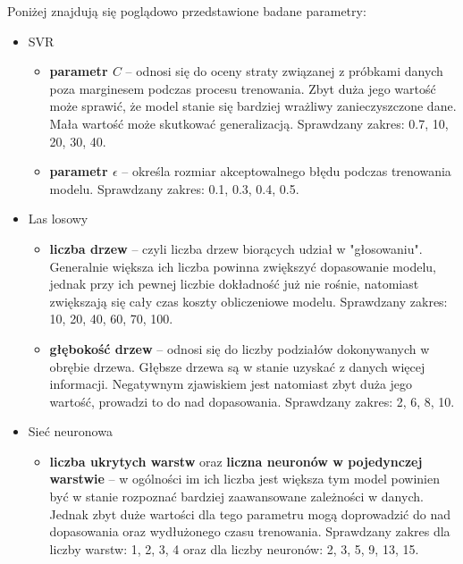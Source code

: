 Poniżej znajdują się poglądowo przedstawione badane parametry: 
\begin{itemize}[label=$\bullet$]
	\item SVR 
		\begin{itemize}[noitemsep,nolistsep]
			\item \textbf{parametr $C$} -- odnosi się do oceny straty związanej z próbkami danych poza marginesem podczas procesu trenowania.	 Zbyt duża jego wartość może sprawić, że model stanie się bardziej wrażliwy zanieczyszczone dane. Mała wartość może skutkować generalizacją. Sprawdzany zakres: 0.7, 10, 20, 30, 40.
			\item \textbf{parametr $\epsilon$} -- określa rozmiar akceptowalnego błędu podczas trenowania modelu. Sprawdzany zakres: 0.1, 0.3, 0.4, 0.5.
		\end{itemize}  
	
	\item Las losowy
	\begin{itemize}[noitemsep,nolistsep]
		\item \textbf{liczba drzew} -- czyli liczba drzew biorących udział w "głosowaniu". Generalnie większa ich liczba powinna  zwiększyć dopasowanie modelu, jednak przy ich pewnej liczbie dokładność już nie rośnie, natomiast zwiększają się cały czas koszty obliczeniowe modelu. Sprawdzany zakres: 10, 20, 40, 60, 70, 100.
		\item \textbf{głębokość drzew} -- odnosi się do liczby podziałów dokonywanych w obrębie drzewa. Głębsze drzewa są w stanie uzyskać z danych więcej informacji. Negatywnym zjawiskiem jest natomiast zbyt duża jego wartość, prowadzi to do nad dopasowania. Sprawdzany zakres: 2, 6, 8, 10.
	\end{itemize}  
	
	\item Sieć neuronowa
	\begin{itemize}[noitemsep,nolistsep]
		\item \textbf{liczba ukrytych warstw} oraz \textbf{liczna neuronów w pojedynczej warstwie} -- w ogólności im ich liczba jest większa tym model powinien być w stanie rozpoznać bardziej zaawansowane zależności w danych. Jednak zbyt duże wartości dla tego parametru mogą doprowadzić do nad dopasowania oraz  wydłużonego czasu trenowania. Sprawdzany zakres dla liczby warstw: 1, 2, 3, 4 oraz dla liczby neuronów: 2, 3, 5, 9, 13, 15.
	\end{itemize}   
\end{itemize}

